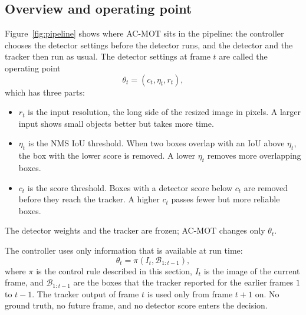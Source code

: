 \documentclass[journal]{new-aiaa}
\begin{document}
\subsection{Overview and operating point}\label{sec:overview}
Figure~\ref{fig:pipeline} shows where AC-MOT sits in the pipeline: the
controller chooses the detector settings before the detector runs, and the
detector and the tracker then run as usual. The detector settings at frame
$t$ are called the operating point
\begin{equation}
\theta_t = (c_t, \eta_t, r_t),
\label{eq:theta}
\end{equation}
which has three parts:
\begin{itemize}
\item $r_t$ is the input resolution, the long side of the resized image in
      pixels. A larger input shows small objects better but takes more time.
\item $\eta_t$ is the NMS IoU threshold. When two boxes overlap with an
      IoU above $\eta_t$, the box with the lower
      score is removed. A lower $\eta_t$ removes more overlapping boxes.
\item $c_t$ is the score threshold. Boxes with a detector score below $c_t$
      are removed before they reach the tracker. A higher $c_t$ passes fewer
      but more reliable boxes.
\end{itemize}
The detector weights and the tracker are frozen; AC-MOT changes only
$\theta_t$.

The controller uses only information that is available at run time:
\begin{equation}
\theta_t = \pi\left(I_t, \mathcal{B}_{1:t-1}\right),
\label{eq:policy}
\end{equation}
where $\pi$ is the control rule described in this section, $I_t$ is the image
of the current frame, and $\mathcal{B}_{1:t-1}$ are the boxes that the tracker
reported for the earlier frames $1$ to $t-1$. The tracker output of
frame $t$ is used only from frame $t+1$ on. No ground truth, no future frame,
and no detector score enters the decision.
\end{document}
